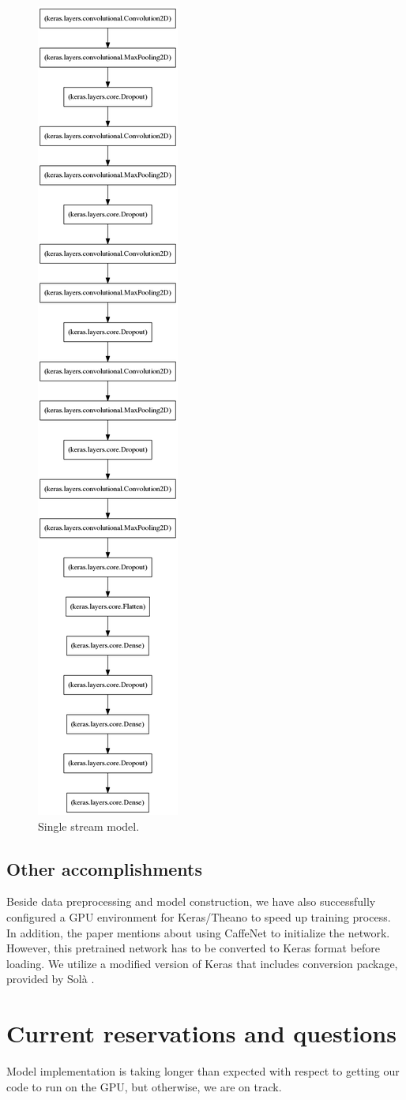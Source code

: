 \documentclass[paper=letter, fontsize=12pt]{article}
\begin{document}
\begin{figure}[htbp]
	\centering
	\includegraphics[width=.24\textwidth]{stream_model}
	\caption{Single stream model.}
	\label{fig:stream_model}
\end{figure}

\subsection{Other accomplishments}
Beside data preprocessing and model construction, we have also successfully configured a GPU environment for Keras/Theano to speed up training process. In addition, the paper mentions about using CaffeNet to initialize the network. However, this pretrained network has to be converted to Keras format before loading. We utilize a modified version of Keras that includes conversion package, provided by Sol\`{a} \cite{Sola2016}.

\section{Current reservations and questions}

Model implementation is taking longer than expected with respect to getting our code to run on the GPU, but otherwise, we are on track.

\newpage




\end{document}
